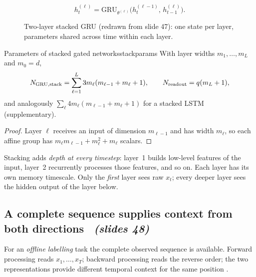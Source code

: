 \documentclass[11pt,a4paper]{article}
\newcommand{\sltag}[1]{\texorpdfstring{\ \emph{(slides #1)}}{ (slides #1)}}
\begin{document}
\[
h^{(\ell)}_t=\mathrm{GRU}_{\theta^{(\ell)}}\big(h^{(\ell-1)}_t,\,h^{(\ell)}_{t-1}\big).
\]
\begin{figure}[H]\centering
{}
\caption{Two-layer stacked GRU (redrawn from slide 47): one state per layer, parameters shared across time within each layer.}
\end{figure}

\begin{proposition}{Parameters of stacked gated networks}{stackparams}
With layer widths $m_1,\dots,m_L$ and $m_0=d$,
\[
N_{\rm GRU,stack}=\sum_{\ell=1}^{L}3m_\ell(m_{\ell-1}+m_\ell+1),\qquad N_{\rm readout}=q(m_L+1),
\]
and analogously $\sum_\ell4m_\ell(m_{\ell-1}+m_\ell+1)$ for a stacked LSTM (supplementary).
\end{proposition}
\begin{proof}
Layer $\ell$ receives an input of dimension $m_{\ell-1}$ and has width $m_\ell$, so each affine group has $m_\ell m_{\ell-1}+m_\ell^2+m_\ell$ scalars.
\end{proof}

\begin{intuition}
Stacking adds \emph{depth at every timestep}: layer~1 builds low-level features of the input, layer~2 recurrently processes those features, and so on. Each layer has its own memory timescale. Only the \emph{first} layer sees raw $x_t$; every deeper layer sees the hidden output of the layer below.
\end{intuition}

\subsection{A complete sequence supplies context from both directions \sltag{48}}

For an \emph{offline labelling} task the complete observed sequence is available. Forward processing reads $x_1,\dots,x_T$; backward processing reads the reverse order; the two representations provide different temporal context for the same position \cite{r12}.
\end{document}
